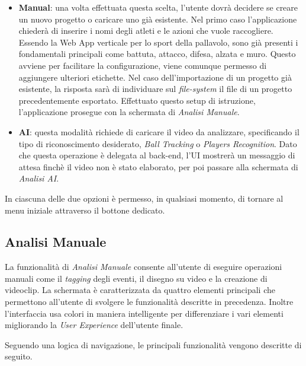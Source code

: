 \begin{itemize}
    \item \textbf{Manual}: una volta effettuata questa scelta, l'utente dovrà decidere se creare un nuovo progetto o caricare uno già esistente. Nel primo caso l'applicazione chiederà di inserire i nomi degli atleti e le azioni che vuole raccogliere. Essendo la Web App verticale per lo sport della pallavolo, sono già presenti i fondamentali principali come battuta, attacco, difesa, alzata e muro. Questo avviene per facilitare la configurazione, viene comunque permesso di aggiungere ulteriori etichette. Nel caso dell'importazione di un progetto già esistente, la risposta sarà di individuare sul \textit{file-system} il file di un progetto precedentemente esportato. Effettuato questo setup di istruzione, l'applicazione prosegue con la schermata di \textit{Analisi Manuale}.
    
    \item \textbf{AI}: questa modalità richiede di caricare il video da analizzare, specificando il tipo di riconoscimento desiderato, \textit{Ball Tracking} o \textit{Players Recognition}. Dato che questa operazione è delegata al back-end, l'UI mostrerà un messaggio di attesa finchè il video non è stato elaborato, per poi passare alla schermata di \textit{Analisi AI}.
    
\end{itemize}


\noindent In ciascuna delle due opzioni è permesso, in qualsiasi momento, di tornare al menu iniziale attraverso il bottone dedicato.



\subsection{Analisi Manuale}
\label{subsec:funzionalita_manual}

La funzionalità di \textit{Analisi Manuale} consente all'utente di eseguire operazioni manuali come il \textit{tagging} degli eventi, il disegno su video e la creazione di videoclip. La schermata è caratterizzata da quattro elementi principali che permettono all'utente di svolgere le funzionalità descritte in precedenza. Inoltre l'interfaccia usa colori in maniera intelligente per differenziare i vari elementi migliorando la \textit{User Experience} dell'utente finale.

Seguendo una logica di navigazione, le principali funzionalità vengono descritte di seguito.



